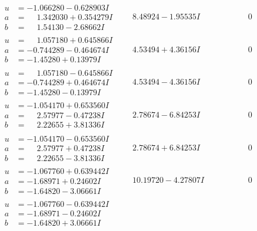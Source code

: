 \documentclass[1p]{elsarticle_modified}
\theoremstyle{definition}
\begin{document}
$$\begin{array}{c|c|c}
\begin{aligned}
u &= -1.066280 - 0.628903 I \\
a &= \phantom{-}1.342030 + 0.354279 I \\
b &= \phantom{-}1.54130 - 2.68662 I\end{aligned}
 & \phantom{-}8.48924 - 1.95535 I & \phantom{-0.000000 } 0 \\ \hline\begin{aligned}
u &= \phantom{-}1.057180 + 0.645866 I \\
a &= -0.744289 - 0.464674 I \\
b &= -1.45280 + 0.13979 I\end{aligned}
 & \phantom{-}4.53494 + 4.36156 I & \phantom{-0.000000 } 0 \\ \hline\begin{aligned}
u &= \phantom{-}1.057180 - 0.645866 I \\
a &= -0.744289 + 0.464674 I \\
b &= -1.45280 - 0.13979 I\end{aligned}
 & \phantom{-}4.53494 - 4.36156 I & \phantom{-0.000000 } 0 \\ \hline\begin{aligned}
u &= -1.054170 + 0.653560 I \\
a &= \phantom{-}2.57977 - 0.47238 I \\
b &= \phantom{-}2.22655 + 3.81336 I\end{aligned}
 & \phantom{-}2.78674 - 6.84253 I & \phantom{-0.000000 } 0 \\ \hline\begin{aligned}
u &= -1.054170 - 0.653560 I \\
a &= \phantom{-}2.57977 + 0.47238 I \\
b &= \phantom{-}2.22655 - 3.81336 I\end{aligned}
 & \phantom{-}2.78674 + 6.84253 I & \phantom{-0.000000 } 0 \\ \hline\begin{aligned}
u &= -1.067760 + 0.639442 I \\
a &= -1.68971 + 0.24602 I \\
b &= -1.64820 - 3.06661 I\end{aligned}
 & \phantom{-}10.19720 - 4.27807 I & \phantom{-0.000000 } 0 \\ \hline\begin{aligned}
u &= -1.067760 - 0.639442 I \\
a &= -1.68971 - 0.24602 I \\
b &= -1.64820 + 3.06661 I\end{aligned}

\end{array}$$
\end{document}
